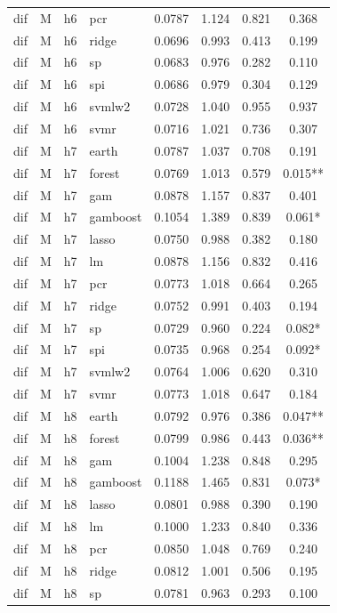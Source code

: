 \begin{ThreePartTable}
\begin{longtable}[t]{llclcccc}
dif & M & h6 & pcr & 0.0787 & 1.124 & 0.821 & 0.368\\
dif & M & h6 & ridge & 0.0696 & 0.993 & 0.413 & 0.199\\
dif & M & h6 & sp & 0.0683 & 0.976 & 0.282 & 0.110\\
dif & M & h6 & spi & 0.0686 & 0.979 & 0.304 & 0.129\\
dif & M & h6 & svmlw2 & 0.0728 & 1.040 & 0.955 & 0.937\\
dif & M & h6 & svmr & 0.0716 & 1.021 & 0.736 & 0.307\\
\addlinespace
dif & M & h7 & earth & 0.0787 & 1.037 & 0.708 & 0.191\\
dif & M & h7 & forest & 0.0769 & 1.013 & 0.579 & 0.015**\\
dif & M & h7 & gam & 0.0878 & 1.157 & 0.837 & 0.401\\
dif & M & h7 & gamboost & 0.1054 & 1.389 & 0.839 & 0.061*\\
dif & M & h7 & lasso & 0.0750 & 0.988 & 0.382 & 0.180\\
dif & M & h7 & lm & 0.0878 & 1.156 & 0.832 & 0.416\\
dif & M & h7 & pcr & 0.0773 & 1.018 & 0.664 & 0.265\\
dif & M & h7 & ridge & 0.0752 & 0.991 & 0.403 & 0.194\\
dif & M & h7 & sp & 0.0729 & 0.960 & 0.224 & 0.082*\\
dif & M & h7 & spi & 0.0735 & 0.968 & 0.254 & 0.092*\\
dif & M & h7 & svmlw2 & 0.0764 & 1.006 & 0.620 & 0.310\\
dif & M & h7 & svmr & 0.0773 & 1.018 & 0.647 & 0.184\\
\addlinespace
dif & M & h8 & earth & 0.0792 & 0.976 & 0.386 & 0.047**\\
dif & M & h8 & forest & 0.0799 & 0.986 & 0.443 & 0.036**\\
dif & M & h8 & gam & 0.1004 & 1.238 & 0.848 & 0.295\\
dif & M & h8 & gamboost & 0.1188 & 1.465 & 0.831 & 0.073*\\
dif & M & h8 & lasso & 0.0801 & 0.988 & 0.390 & 0.190\\
dif & M & h8 & lm & 0.1000 & 1.233 & 0.840 & 0.336\\
dif & M & h8 & pcr & 0.0850 & 1.048 & 0.769 & 0.240\\
dif & M & h8 & ridge & 0.0812 & 1.001 & 0.506 & 0.195\\
dif & M & h8 & sp & 0.0781 & 0.963 & 0.293 & 0.100\\

\end{longtable}
\end{ThreePartTable}
